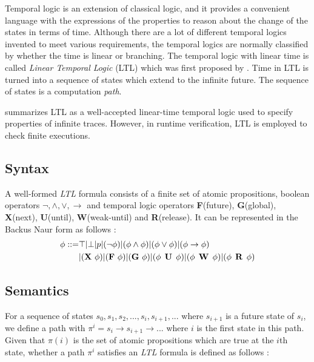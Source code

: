 Temporal logic is an extension of classical logic, and it provides a convenient language with the expressions of the properties to reason about the change of the states in terms of time. Although there are a lot of different temporal logics invented to meet various requirements, the temporal logics are normally classified by whether the time is linear or branching. The temporal logic with linear time is called \emph{Linear Temporal Logic} (LTL) which was first proposed by \cite{pnueli97}. Time in LTL is turned into a sequence of states which extend to the infinite future. The sequence of states is a computation \emph{path}. \citep{clarke1999model} \citep{huth2004}

\cite{leucker2009brief} summarizes LTL as a well-accepted linear-time temporal logic used to specify properties of infinite traces. However, in runtime verification, LTL is employed to check finite executions.

\subsection{Syntax}

A well-formed \emph{LTL} formula consists of a finite set of atomic propositions, boolean operators $\neg, \wedge, \vee, \rightarrow$ and temporal logic operators \textbf{F}(future), \textbf{G}(global), \textbf{X}(next), \textbf{U}(until), \textbf{W}(weak-until) and \textbf{R}(release). It can be represented in the Backus Naur form as follows \citep{huth2004}:
\begin{align}
\phi ::= & \top | \bot | p | (\neg\phi) | (\phi \wedge \phi) | (\phi \vee \phi) | (\phi \rightarrow \phi) \nonumber \\
& | (\mathop{\mbox{\textbf{X}}}\, \phi) | (\mathop{\mbox{\textbf{F}}}\, \phi) | (\mathop{\mbox{\textbf{G}}}\, \phi) | (\phi \mathrel{\mbox{\,\textbf{U}}}\, \phi) | (\phi \mathrel{\mbox{\,\textbf{W}}}\, \phi) | (\phi \mathrel{\mbox{\,\textbf{R}}}\, \phi)
\end{align}

\subsection{Semantics}

For a sequence of states $s_0, s_1, s_2, ..., s_i, s_{i + 1}, ...$ where $s_{i + 1}$ is a future state of $s_i$, we define a path with $\pi^i = s_i \rightarrow s_{i + 1} \rightarrow ...$ where $i$ is the first state in this path. Given that $\pi(i)$ is the set of atomic propositions which are true at the $i$th state, whether a path $\pi^i$ satisfies an \emph{LTL} formula is defined as follows \citep{rozier2011linear}:

